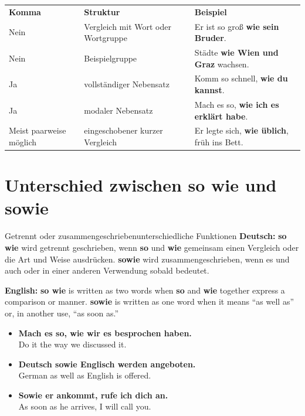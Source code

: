 \documentclass[a4paper,11pt]{article}
\newcommand{\GermanText}[1]{\textbf{Deutsch: }#1\par}
\newcommand{\EnglishText}[1]{{\small\color{SoftGray}\textbf{English: }#1\par}}
\newcommand{\ExampleItem}[2]{\item \textbf{#1}\\{\small\color{SoftGray}#2}}
\newcommand{\TableHead}[1]{\cellcolor{HeaderBlueDark}\color{white}\textbf{#1}}
\begin{document}
\begin{longtable}{>{\raggedright\arraybackslash}p{}>{\raggedright\arraybackslash}p{}>{\raggedright\arraybackslash}p{}}
\TableHead{Komma} & \TableHead{Struktur} & \TableHead{Beispiel} \\
Nein & Vergleich mit Wort oder Wortgruppe & Er ist so groß \textbf{wie sein Bruder}.\\
Nein & Beispielgruppe & Städte \textbf{wie Wien und Graz} wachsen.\\
Ja & vollständiger Nebensatz & Komm so schnell, \textbf{wie du kannst}.\\
Ja & modaler Nebensatz & Mach es so, \textbf{wie ich es erklärt habe}.\\
Meist paarweise möglich & eingeschobener kurzer Vergleich & Er legte sich, \textbf{wie üblich}, früh ins Bett.\\
\end{longtable}

\section{Unterschied zwischen \glqq so wie\grqq{} und \glqq sowie\grqq}

\begin{grammarentry}{Getrennt oder zusammengeschrieben}{unterschiedliche Funktionen}
\GermanText{\textbf{so wie} wird getrennt geschrieben, wenn \textbf{so} und \textbf{wie} gemeinsam einen Vergleich oder die Art und Weise ausdrücken. \textbf{sowie} wird zusammengeschrieben, wenn es \glqq und auch\grqq{} oder in einer anderen Verwendung \glqq sobald\grqq{} bedeutet.}
\EnglishText{\textbf{so wie} is written as two words when \textbf{so} and \textbf{wie} together express a comparison or manner. \textbf{sowie} is written as one word when it means ``as well as'' or, in another use, ``as soon as.''}
\end{grammarentry}

\begin{exbox}
\begin{itemize}
\ExampleItem{Mach es so, wie wir es besprochen haben.}{Do it the way we discussed it.}
\ExampleItem{Deutsch sowie Englisch werden angeboten.}{German as well as English is offered.}
\ExampleItem{Sowie er ankommt, rufe ich dich an.}{As soon as he arrives, I will call you.}
\end{itemize}
\end{exbox}
\end{document}

